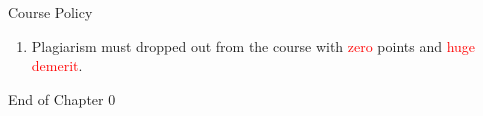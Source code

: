 \documentclass{beamer}
\begin{document}
\begin{frame}{Course Policy}
\begin{enumerate}
\item Plagiarism must dropped out from the course with \textcolor{red}{zero} points and \textcolor{red}{huge demerit}. \\
\end{enumerate}
\end{frame}
\begin{frame}{}
\begin{center}
\Large{End of Chapter 0}
\end{center}
\end{frame}
\end{document}
